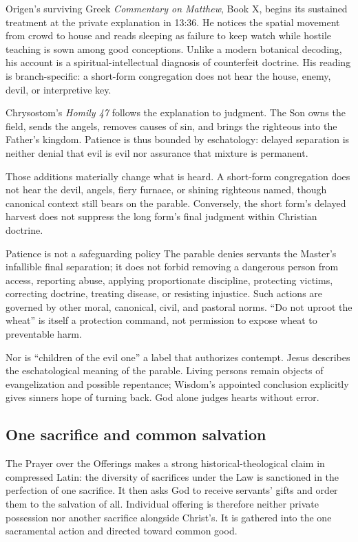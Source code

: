 Origen's surviving Greek \emph{Commentary on Matthew}, Book X, begins its sustained treatment at the private explanation in 13:36. He notices the spatial movement from crowd to house and reads sleeping as failure to keep watch while hostile teaching is sown among good conceptions. Unlike a modern botanical decoding, his account is a spiritual-intellectual diagnosis of counterfeit doctrine. His reading is branch-specific: a short-form congregation does not hear the house, enemy, devil, or interpretive key.

Chrysostom's \emph{Homily 47} follows the explanation to judgment. The Son owns the field, sends the angels, removes causes of sin, and brings the righteous into the Father's kingdom. Patience is thus bounded by eschatology: delayed separation is neither denial that evil is evil nor assurance that mixture is permanent.

Those additions materially change what is heard. A short-form congregation does not hear the devil, angels, fiery furnace, or shining righteous named, though canonical context still bears on the parable. Conversely, the short form's delayed harvest does not suppress the long form's final judgment within Christian doctrine.

\begin{studybox}{Patience is not a safeguarding policy}
The parable denies servants the Master's infallible final separation; it does not forbid removing a dangerous person from access, reporting abuse, applying proportionate discipline, protecting victims, correcting doctrine, treating disease, or resisting injustice. Such actions are governed by other moral, canonical, civil, and pastoral norms. “Do not uproot the wheat” is itself a protection command, not permission to expose wheat to preventable harm.
\end{studybox}

Nor is “children of the evil one” a label that authorizes contempt. Jesus describes the eschatological meaning of the parable. Living persons remain objects of evangelization and possible repentance; Wisdom's appointed conclusion explicitly gives sinners hope of turning back. God alone judges hearts without error.

\subsection*{One sacrifice and common salvation\enspace{}}

The Prayer over the Offerings makes a strong historical-theological claim in compressed Latin: the diversity of sacrifices under the Law is sanctioned in the perfection of one sacrifice. It then asks God to receive servants' gifts and order them to the salvation of all. Individual offering is therefore neither private possession nor another sacrifice alongside Christ's. It is gathered into the one sacramental action and directed toward common good.


